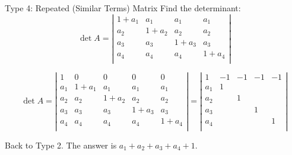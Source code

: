 \documentclass{beamer}
\begin{document}
\begin{frame}{Type 4: Repeated (Similar Terms) Matrix}
Find the determinant:
\begin{equation*}
    \det A=\left| \begin{matrix}
        1+a_1&		a_1&		a_1&		a_1		\\
        a_2&		1+a_2&		a_2&		a_2		\\
        a_3&		a_3&		1+a_3&		a_3		\\
        a_4&		a_4&		a_4&		1+a_4		\\
    \end{matrix} \right|
\end{equation*}

\begin{equation*}
    \det A=\left| \begin{matrix}
        1&		0&		0&		0&		0\\
        a_1&		1+a_1&		a_1&		a_1&		a_1\\
        a_2&		a_2&		1+a_2&		a_2&		a_2\\
        a_3&		a_3&		a_3&		1+a_3&		a_3\\
        a_4&		a_4&		a_4&		a_4&		1+a_4\\
    \end{matrix} \right|=\left| \begin{matrix}
        1&		-1&		-1&		-1&		-1\\
        a_1&		1&		&		&		\\
        a_2&		&		1&		&		\\
        a_3&		&		&		1&		\\
        a_4&		&		&		&		1\\
    \end{matrix} \right|
\end{equation*}

Back to Type 2. The answer is $a_1+a_2+a_3+a_4+1$.
\end{frame}
\end{document}
